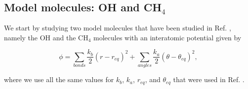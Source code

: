 \documentclass[aps,prb,superscriptaddress,amsmath,amssymb,showpacs,twocolumn]{revtex4}
\begin{document}



\subsection{Model molecules: OH and CH$_4$}

We start by studying two model molecules that have been studied in Ref. \cite{witt+09jcp},
namely the OH and the CH$_4$ molecules with an interatomic potential given by

\begin{equation}
\phi=\sum_{bonds} \frac{k_b}{2} (r-r_{eq})^2 + \sum_{angles} \frac{k_a}{2}(\theta - \theta_{eq})^2,
\label{eq:model}
\end{equation}

\noindent where we use all the same values for $k_b$, $k_a$, $r_{eq}$, and $\theta_{eq}$ that were used in Ref. \cite{witt+09jcp}.
\end{document}
